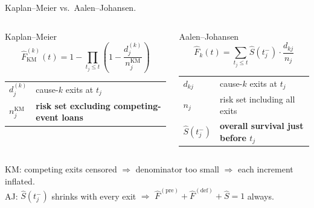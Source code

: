 \documentclass[10pt,aspectratio=169]{beamer}
\begin{document}
\begin{frame}{Kaplan--Meier vs.\ Aalen--Johansen.}
    \begin{columns}[T,onlytextwidth]
        \begin{block}{Kaplan--Meier}
        \[
            \hat{F}^{(k)}_{\mathrm{KM}}(t)
            = 1 - \prod_{t_j \le t}\!\left(1 - \frac{d_{j}^{(k)}}{n_j^{\mathrm{KM}}}\right)
        \]
        \vspace{0.1em}
        \small
        \begin{tabular}{@{}ll@{}}
            $d_j^{(k)}$ & cause-$k$ exits at $t_j$ \\[2pt]
            $n_j^{\mathrm{KM}}$ & \textbf{risk set excluding competing-event loans}\\[2pt]
        \end{tabular}
        \end{block}

        \begin{block}{Aalen--Johansen}
        \[
            \hat{F}_k(t) = \sum_{t_j \le t} \hat{S}(t_j^{-})\cdot \frac{d_{kj}}{n_j}
        \]
        \vspace{0.1em}
        \small
        \begin{tabular}{@{}ll@{}}
            $d_{kj}$        & cause-$k$ exits at $t_j$ \\[2pt]
            $n_j$           & risk set including all exits \\[2pt]
            $\hat{S}(t_j^-)$ & \textbf{overall survival just before $t_j$} \\[2pt]
        \end{tabular}
        \end{block}
    \end{columns}
    \vspace{0.6em}
    \begin{center}
        \small
        KM: competing exits censored $\Rightarrow$ denominator too small $\Rightarrow$ each increment inflated.\\[3pt]
        AJ: $\hat{S}(t_j^-)$ shrinks with every exit $\Rightarrow$ $\hat{F}^{(\mathrm{pre})} + \hat{F}^{(\mathrm{def})} + \hat{S} = 1$ always.
    \end{center}
\end{frame}
\end{document}
